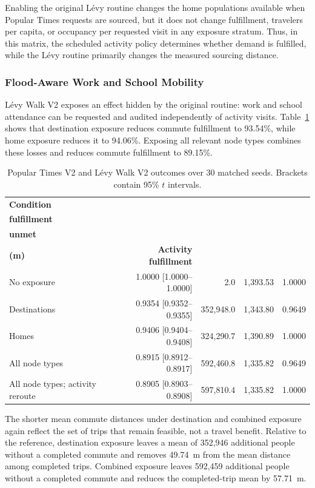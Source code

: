 Enabling the original L\'evy routine changes the home populations available when Popular Times requests are sourced, but it does not change fulfillment, travelers per capita, or occupancy per requested visit in any exposure stratum. Thus, in this matrix, the scheduled activity policy determines whether demand is fulfilled, while the L\'evy routine primarily changes the measured sourcing distance.

\subsubsection{Flood-Aware Work and School Mobility}

L\'evy Walk V2 exposes an effect hidden by the original routine: work and school attendance can be requested and audited independently of activity visits. Table~\ref{tbl:levy_v2_disruption} shows that destination exposure reduces commute fulfillment to 93.54\%, while home exposure reduces it to 94.06\%. Exposing all relevant node types combines these losses and reduces commute fulfillment to 89.15\%.

\begin{table}[ht]
\centering
\footnotesize
\caption{Popular Times V2 and L\'evy Walk V2 outcomes over 30 matched seeds. Brackets contain 95\% $t$ intervals.}
\label{tbl:levy_v2_disruption}
\begin{tabularx}{\linewidth}{@{}lrrrX@{}}
\toprule
\textbf{Condition} &
\shortstack{\textbf{Commute}\\\textbf{fulfillment}} &
\shortstack{\textbf{Commute}\\\textbf{unmet}} &
\shortstack{\textbf{Mean distance}\\\textbf{(m)}} &
\textbf{Activity fulfillment} \\
\midrule
No exposure
    & 1.0000 [1.0000--1.0000] & 2.0 & 1,393.53 & 1.0000 \\
Destinations
    & 0.9354 [0.9352--0.9355] & 352,948.0 & 1,343.80 & 0.9649 \\
Homes
    & 0.9406 [0.9404--0.9408] & 324,290.7 & 1,390.89 & 1.0000 \\
All node types
    & 0.8915 [0.8912--0.8917] & 592,460.8 & 1,335.82 & 0.9649 \\
All node types; activity reroute
    & 0.8905 [0.8903--0.8908] & 597,810.4 & 1,335.82 & 1.0000 \\
\bottomrule
\end{tabularx}
\end{table}

The shorter mean commute distances under destination and combined exposure again reflect the set of trips that remain feasible, not a travel benefit. Relative to the reference, destination exposure leaves a mean of 352,946 additional people without a completed commute and removes 49.74~m from the mean distance among completed trips. Combined exposure leaves 592,459 additional people without a completed commute and reduces the completed-trip mean by 57.71~m.

